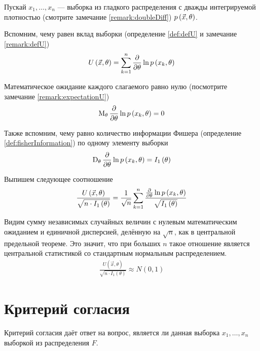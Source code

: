 Пускай $x_1, \dots, x_n$ --- выборка из гладкого распределения с дважды
интегрируемой плотностью (смотрите замечание \ref{remark:doubleDiff})
$p\left(\vec{x}, \theta\right)$.

Вспомним, чему равен вклад выборки (определение \ref{def:defU} и замечание
\ref{remark:defU})
\begin{align*}
    U\left( \vec{x},\theta \right)
    = \sum_{k=1}^n\frac{\partial}{\partial\theta}\ln{p\left(x_k,\theta\right)}
\end{align*}

Математическое ожидание каждого слагаемого равно нулю
(посмотрите замечание \ref{remark:expectationU})
\begin{align*}
    \operatorname{M}_{\theta} \frac{\partial}{\partial \theta} \ln{p\left(x_k, \theta\right)}
    = 0
\end{align*}

Также вспомним, чему равно количество информации Фишера (определение
\ref{def:fisherInformation}) по одному элементу выборки
\begin{align*}
    \operatorname{D}_{\theta} \frac{\partial}{\partial\theta}
        \ln{p\left(x_k, \theta\right)}
    = I_1\left( \theta \right)
\end{align*}

Выпишем следующее соотношение
\begin{align*}
    \frac{U\left( \vec{x}, \theta \right)}{
        \sqrt{n \cdot I_1\left( \theta \right)}}
    = \frac{1}{\sqrt{n}} \sum_{k=1}^{n}\frac{
        \frac{\partial}{\partial\theta}\ln{p\left(x_k, \theta\right)}}{
        \sqrt{I_1\left( \theta \right)}}
\end{align*}

Видим сумму независимых случайных величин с нулевым математическим ожиданием и
единичной дисперсией, делённую на $\sqrt{n}$, как в центральной предельной
теореме. Это значит, что при больших $n$ такое отношение является центральной
статистикой со стандартным нормальным распределением.
\begin{align*}
    \frac{U\left( \vec{x}, \theta \right)}{
        \sqrt{n \cdot I_1\left( \theta \right)}} \approx N\left( 0, 1 \right)
\end{align*}

\section{Критерий согласия}

Критерий согласия даёт ответ на вопрос, является ли данная выборка
$x_1, \dots, x_n$ выборкой из распределения $F$.

